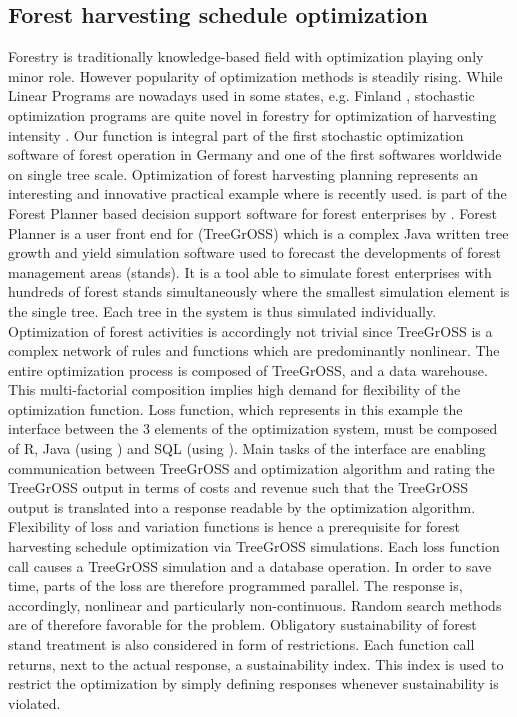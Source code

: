 \subsection{Forest harvesting schedule optimization}
Forestry is traditionally knowledge-based field with optimization playing only minor role. However popularity of optimization methods is steadily rising. While Linear Programs are nowadays used in some states, e.g. Finland \citep{redsven_2012}, stochastic optimization programs are quite novel in forestry for optimization of harvesting intensity \citep{kangas_2015}. Our function is integral part of the first stochastic optimization software of forest operation in Germany and one of the first softwares worldwide on single tree scale. Optimization of forest harvesting planning represents an interesting and innovative practical example where  is recently used.  is part of the Forest Planner based decision support software for forest enterprises by \citet{hansen_2014}. Forest Planner is a user front end for  (TreeGrOSS) which is a complex Java written tree growth and yield simulation software used to forecast the developments of forest management areas (stands). It is a tool able to simulate forest enterprises with hundreds of forest stands simultaneously where the smallest simulation element is the single tree. Each tree in the system is thus simulated individually. Optimization of forest activities is accordingly not trivial since TreeGrOSS is a complex network of rules and functions which are predominantly nonlinear. The entire optimization process is composed of TreeGrOSS,  and a data warehouse. This multi-factorial composition implies high demand for flexibility of the optimization function. Loss function, which represents in this example the interface between the 3 elements of the optimization system, must be composed of R, Java (using ) and SQL (using ). Main tasks of the interface are enabling communication between TreeGrOSS and optimization algorithm and rating the TreeGrOSS output in terms of costs and revenue such that the TreeGrOSS output is translated into a response readable by the optimization algorithm. Flexibility of loss and variation functions is hence a prerequisite for forest harvesting schedule optimization via TreeGrOSS simulations. Each loss function call causes a TreeGrOSS simulation and a database operation. In order to save time, parts of the loss are therefore programmed parallel. The response is, accordingly, nonlinear and particularly non-continuous. Random search methods are of therefore favorable for the problem. Obligatory sustainability of forest stand treatment is also considered in form of restrictions. Each function call returns, next to the actual response, a sustainability index. This index is used to restrict the optimization by simply defining  responses whenever sustainability is violated.

